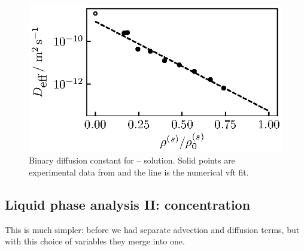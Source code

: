 \documentclass[12pt,twoside]{report}
\begin{document}
\begin{figure}
  \includegraphics[width=\linewidth]{diffusion-fit-nano3}
  \caption{Binary diffusion constant for -- solution.
  Solid points are experimental data from \cite{???} and the line is the numerical vft fit.}
\end{figure}

\subsection{Liquid phase analysis II: concentration}

This is much simpler: before we had separate advection and diffusion terms, but with this choice of variables they merge into one.
\end{document}
